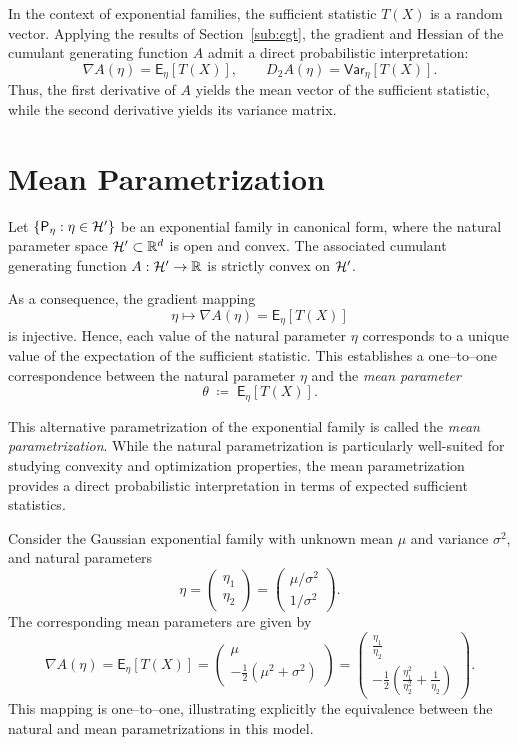 In the context of exponential families, the sufficient statistic \(T(X)\) is a
random vector. Applying the results of
Section~\ref{sub:cgt}, the gradient and Hessian of the cumulant generating function
\(A\) admit a direct probabilistic interpretation:
\[
\nabla A(\eta)
=
\mathsf{E}_\eta[T(X)],
\qquad
D_2 A(\eta)
=
\mathsf{Var}_\eta[T(X)].
\]
Thus, the first derivative of \(A\) yields the mean vector of the sufficient
statistic, while the second derivative yields its variance matrix.

\section{Mean Parametrization}
\label{sec:mp}

Let \(\{\mathsf{P}_\eta : \eta \in \mathcal{H}'\}\) be an exponential family in canonical
form, where the natural parameter space \(\mathcal{H}' \subset \mathbb{R}^d\) is open and
convex. The associated cumulant generating function \(A : \mathcal{H}' \to \mathbb{R}\) is
strictly convex on \(\mathcal{H}'\).

As a consequence, the gradient mapping
\[
\eta \longmapsto \nabla A(\eta)
=
\mathsf{E}_\eta[T(X)]
\]
is injective. Hence, each value of the natural parameter \(\eta\) corresponds to
a unique value of the expectation of the sufficient statistic. This establishes a
one--to--one correspondence between the natural parameter \(\eta\) and the
\emph{mean parameter}
\[
\theta \;\coloneqq\; \mathsf{E}_\eta[T(X)].
\]

This alternative parametrization of the exponential family is called the
\emph{mean parametrization}. While the natural parametrization is particularly
well-suited for studying convexity and optimization properties, the mean
parametrization provides a direct probabilistic interpretation in terms of
expected sufficient statistics.

\begin{ex}
Consider the Gaussian exponential family with unknown mean \(\mu\) and variance
\(\sigma^2\), and natural parameters
\[
\eta
=
\begin{pmatrix}
\eta_1 \\ \eta_2
\end{pmatrix}
=
\begin{pmatrix}
\mu / \sigma^2 \\ 1 / \sigma^2
\end{pmatrix}.
\]
The corresponding mean parameters are given by
\[
\nabla A(\eta)
=
\mathsf{E}_\eta[T(X)]
=
\begin{pmatrix}
\mu \\[0.4em]
-\frac{1}{2}(\mu^2 + \sigma^2)
\end{pmatrix}
=
\begin{pmatrix}
\displaystyle \frac{\eta_1}{\eta_2} \\[0.8em]
\displaystyle -\frac{1}{2}\left(
\frac{\eta_1^2}{\eta_2^2} + \frac{1}{\eta_2}
\right)
\end{pmatrix}.
\]
This mapping is one--to--one, illustrating explicitly the equivalence between the
natural and mean parametrizations in this model.
\end{ex}

